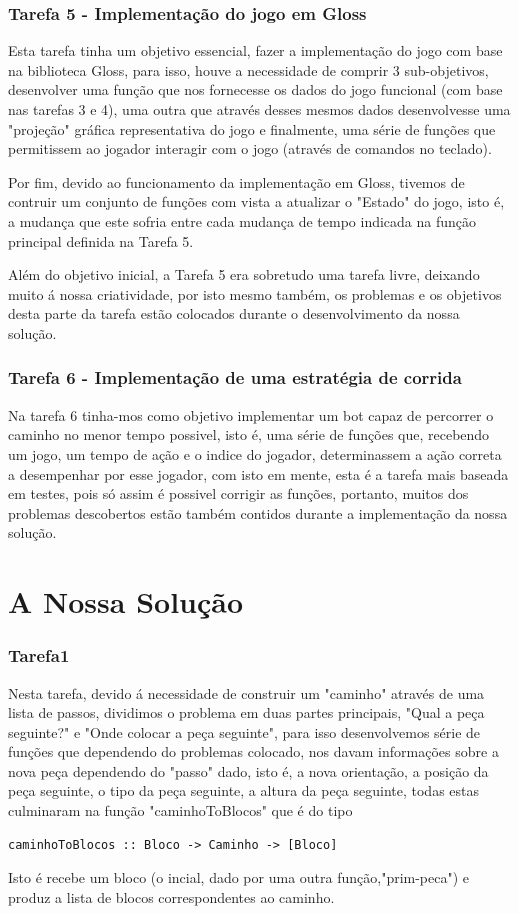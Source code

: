 \documentclass[a4paper]{report} %
\begin{document}
\subsection{Tarefa 5 - Implementação do jogo em Gloss}
Esta tarefa tinha um objetivo essencial, fazer a implementação do jogo com base na biblioteca Gloss, para isso, houve a necessidade de comprir 3 sub-objetivos, desenvolver uma função que nos fornecesse os dados do jogo funcional (com base nas tarefas 3 e 4), uma outra que através desses mesmos dados desenvolvesse uma "projeção" gráfica representativa do jogo e finalmente, uma série de funções que permitissem ao jogador interagir com o jogo (através de comandos no teclado).

Por fim, devido ao funcionamento da implementação em Gloss, tivemos de contruir um conjunto de funções com vista a atualizar o "Estado" do jogo, isto é, a mudança que este sofria entre cada mudança de tempo indicada na função principal definida na Tarefa 5.

Além do objetivo inicial, a Tarefa 5 era sobretudo uma tarefa livre, deixando muito á nossa criatividade, por isto mesmo também, os problemas e os objetivos desta parte da tarefa estão colocados durante o desenvolvimento da nossa solução.

\subsection{Tarefa 6 - Implementação de uma estratégia de corrida}
Na tarefa 6 tinha-mos como objetivo implementar um bot capaz de percorrer o caminho no menor tempo possivel, isto é, uma série de funções que, recebendo um jogo, um tempo de ação e o indice do jogador, determinassem a ação correta a desempenhar por esse jogador, com isto em mente, esta é a tarefa mais baseada em testes, pois só assim é possivel corrigir as funções, portanto, muitos dos problemas descobertos estão também contidos durante a implementação da nossa solução.

\chapter{A Nossa Solução}
\label{sec:solucao}
\subsection{Tarefa1}
Nesta tarefa, devido á necessidade de construir um "caminho" através de uma lista de passos, dividimos o problema em duas partes principais, "Qual a peça seguinte?" e "Onde colocar a peça seguinte", para isso desenvolvemos série de funções que dependendo do problemas colocado, nos davam informações sobre a nova peça dependendo do "passo" dado, isto é, a nova orientação, a posição da peça seguinte, o tipo da peça seguinte, a altura da peça seguinte, todas estas culminaram na função "caminhoToBlocos" que é do tipo
\begin{verbatim}
caminhoToBlocos :: Bloco -> Caminho -> [Bloco]
\end{verbatim}
Isto é recebe um bloco (o incial, dado por uma outra função,"prim-peca") e produz a lista de blocos correspondentes ao caminho.
\end{document}
